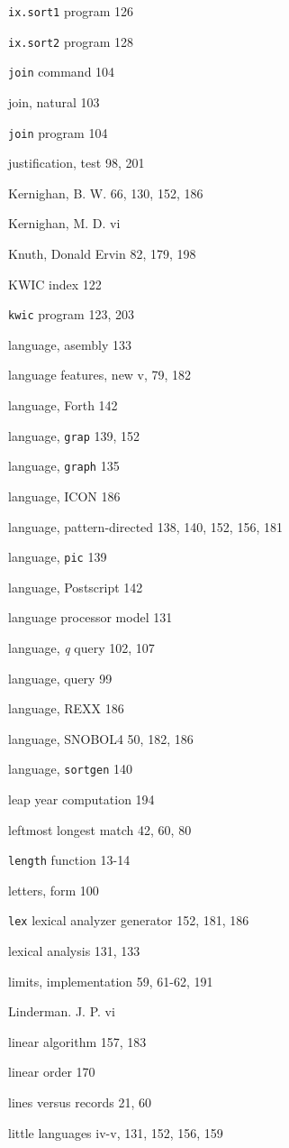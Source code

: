 \begin{multicols}{3}
\verb'ix.sort1' program 126

\verb'ix.sort2' program 128 

\verb'join' command 104

join, natural 103

\verb'join' program 104

justification, test 98, 201

Kernighan, B. W. 66, 130, 152, 186

Kernighan, M. D. vi 

Knuth, Donald Ervin 82, 179, 198

KWIC index 122

\verb'kwic' program 123, 203

language, asembly 133

language features, new v, 79, 182

language, Forth 142

language, \verb'grap' 139, 152

language, \verb'graph' 135

language, ICON 186

language, pattern-directed 138, 140, 152, 156, 181

language, \verb'pic' 139

language, Postscript 142

language processor model 131

language, \textit{q} query 102, 107

language, query 99

language, REXX 186

language, SNOBOL4 50, 182, 186

language, \verb'sortgen' 140

leap year computation 194

leftmost longest match 42, 60, 80

\verb'length' function 13-14

letters, form 100

\verb'lex' lexical analyzer generator 152, 181, 186

lexical analysis 131, 133

limits, implementation 59, 61-62, 191

Linderman. J. P. vi

linear algorithm 157, 183

linear order 170

lines versus records 21, 60

little languages iv-v, 131, 152, 156, 159


\end{multicols}
